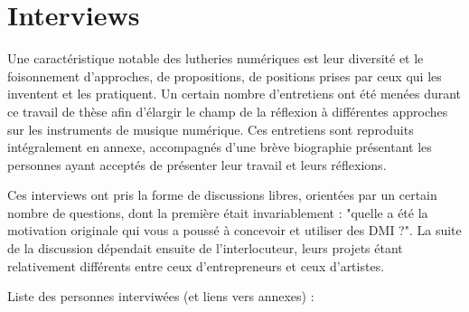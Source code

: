 \section{Interviews}

Une caractéristique notable des lutheries numériques est leur diversité et le foisonnement d'approches, de propositions, de positions prises par ceux qui les inventent et les pratiquent. Un certain nombre d'entretiens ont été menées durant ce travail de thèse afin d'élargir le champ de la réflexion à différentes approches sur les instruments de musique numérique. Ces entretiens sont reproduits intégralement en annexe, accompagnés d'une brève biographie présentant les personnes ayant acceptés de présenter leur travail et leurs réflexions.

Ces interviews ont pris la forme de discussions libres, orientées par un certain nombre de questions, dont la première était invariablement : "quelle a été la motivation originale qui vous a poussé à concevoir et utiliser des DMI ?". La suite de la discussion dépendait ensuite de l'interlocuteur, leurs projets étant relativement différents entre ceux d'entrepreneurs et ceux d'artistes. %


Liste des personnes interviwées (et liens vers annexes) :

